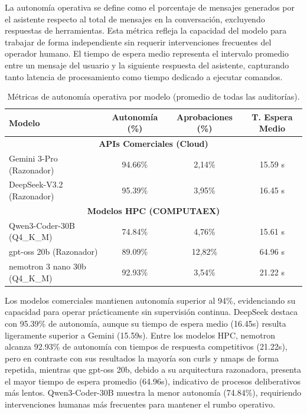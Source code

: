 La autonomía operativa se define como el porcentaje de mensajes generados por el asistente respecto al total de mensajes en la conversación, excluyendo respuestas de herramientas. Esta métrica refleja la capacidad del modelo para trabajar de forma independiente sin requerir intervenciones frecuentes del operador humano. El tiempo de espera medio representa el intervalo promedio entre un mensaje del usuario y la siguiente respuesta del asistente, capturando tanto latencia de procesamiento como tiempo dedicado a ejecutar comandos.

\begin{table}[H]
\centering
\renewcommand{\arraystretch}{1.2}
\small
\begin{tabular}{|l|c|c|c|}
\hline
\rowcolor[gray]{0.85}
\textbf{Modelo} & \textbf{Autonomía (\%)} & \textbf{Aprobaciones (\%)} & \textbf{T. Espera Medio} \\
\hline
\multicolumn{4}{|c|}{\cellcolor{blue!10}\textbf{APIs Comerciales (Cloud)}} \\
\hline
Gemini 3-Pro (Razonador) & 94.66\% & 2,14\% & 15.59 s \\
\hline
DeepSeek-V3.2 (Razonador) & 95.39\% & 3,95\% & 16.45 s \\
\hline
\multicolumn{4}{|c|}{\cellcolor{green!10}\textbf{Modelos HPC (COMPUTAEX)}} \\
\hline
Qwen3-Coder-30B (Q4\_K\_M) & 74.84\% & 4,76\% & 15.61 s \\
\hline
gpt-oss 20b (Razonador) & 89.09\% & 12,82\% & 64.96 s \\
\hline
nemotron 3 nano 30b (Q4\_K\_M) & 92.93\% & 3,54\% & 21.22 s \\
\hline
\end{tabular}
\caption{Métricas de autonomía operativa por modelo (promedio de todas las auditorías).}
\label{tab:metricas_autonomia}
\end{table}

Los modelos comerciales mantienen autonomía superior al 94\%, evidenciando su capacidad para operar prácticamente sin supervisión continua. DeepSeek destaca con 95.39\% de autonomía, aunque su tiempo de espera medio (16.45s) resulta ligeramente superior a Gemini (15.59s). Entre los modelos HPC, nemotron alcanza 92.93\% de autonomía con tiempos de respuesta competitivos (21.22s), pero en contraste con sus resultados la mayoría son curls y nmaps de forma repetida, mientras que gpt-oss 20b,  debido a su arquitectura razonadora, presenta el mayor tiempo de espera promedio (64.96s), indicativo de procesos deliberativos más lentos. Qwen3-Coder-30B muestra la menor autonomía (74.84\%), requiriendo intervenciones humanas más frecuentes para mantener el rumbo operativo.


